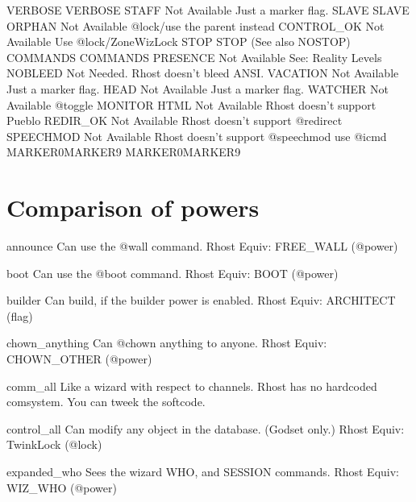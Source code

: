 \documentclass[letterpaper,10pt,english]{sphinxmanual}
\begin{document}
VERBOSE         \sphinxhyphen{} VERBOSE
STAFF           \sphinxhyphen{} Not Available \sphinxhyphen{} Just a marker flag.
SLAVE           \sphinxhyphen{} SLAVE
ORPHAN          \sphinxhyphen{} Not Available \sphinxhyphen{} @lock/use the parent instead
CONTROL\_OK      \sphinxhyphen{} Not Available \sphinxhyphen{} Use @lock/ZoneWizLock
STOP            \sphinxhyphen{} STOP (See also NOSTOP)
COMMANDS        \sphinxhyphen{} COMMANDS
PRESENCE        \sphinxhyphen{} Not Available \sphinxhyphen{} See: Reality Levels
NOBLEED         \sphinxhyphen{} Not Needed.  Rhost doesn’t bleed ANSI.
VACATION        \sphinxhyphen{} Not Available \sphinxhyphen{} Just a marker flag.
HEAD            \sphinxhyphen{} Not Available \sphinxhyphen{} Just a marker flag.
WATCHER         \sphinxhyphen{} Not Available \sphinxhyphen{} @toggle MONITOR
HTML            \sphinxhyphen{} Not Available \sphinxhyphen{} Rhost doesn’t support Pueblo
REDIR\_OK        \sphinxhyphen{} Not Available \sphinxhyphen{} Rhost doesn’t support @redirect
SPEECHMOD       \sphinxhyphen{} Not Available \sphinxhyphen{} Rhost doesn’t support @speechmod \sphinxhyphen{} use @icmd
MARKER0\sphinxhyphen{}MARKER9 \sphinxhyphen{} MARKER0\sphinxhyphen{}MARKER9


\section{Comparison of powers}
\label{\detokenize{powers:comparison-of-powers}}\label{\detokenize{powers::doc}}
\sphinxAtStartPar
announce              Can use the @wall command.
Rhost Equiv: \sphinxhyphen{} FREE\_WALL (@power)

\sphinxAtStartPar
boot                  Can use the @boot command.
Rhost Equiv: BOOT (@power)

\sphinxAtStartPar
builder               Can build, if the builder power is enabled.
Rhost Equiv: ARCHITECT (flag)

\sphinxAtStartPar
chown\_anything        Can @chown anything to anyone.
Rhost Equiv: CHOWN\_OTHER (@power)

\sphinxAtStartPar
comm\_all              Like a wizard with respect to channels.
Rhost has no hardcoded comsystem.  You can tweek the softcode.

\sphinxAtStartPar
control\_all           Can modify any object in the database. (God\sphinxhyphen{}set only.)
Rhost Equiv: TwinkLock (@lock)

\sphinxAtStartPar
expanded\_who          Sees the wizard WHO, and SESSION commands.
Rhost Equiv: WIZ\_WHO (@power)
\end{document}
